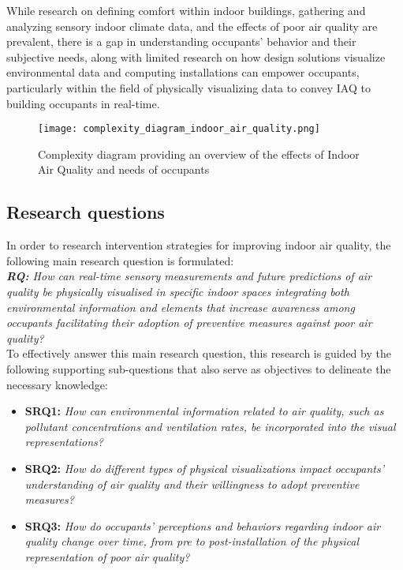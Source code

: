 While research on defining comfort within indoor buildings, gathering and analyzing sensory indoor climate data, and the effects of poor air quality are prevalent, there is a gap in understanding occupants' behavior and their subjective needs, along with limited research on how design solutions visualize environmental data and computing installations can empower occupants, particularly within the field of physically visualizing data to convey IAQ to building occupants in real-time.

\begin{figure}[h]
    \centering
    \texttt{[image: complexity\_diagram\_indoor\_air\_quality.png]}
    \caption{Complexity diagram providing an overview of the effects of Indoor Air Quality and needs of occupants}
    \label{fig:mesh1}
\end{figure}



\subsection{Research questions}

In order to research intervention strategies for improving indoor air quality, the following main research question is formulated: \\

\emph{\textbf{RQ:} How can real-time sensory measurements and future predictions of air quality be physically visualised in specific indoor spaces integrating both environmental information and elements that increase awareness among occupants facilitating their adoption of preventive measures against poor air quality?} \\

To effectively answer this main research question, this research is guided by the following supporting sub-questions that also serve as objectives to delineate the necessary knowledge: \\

\begin{itemize}
    \item \textbf{SRQ1:} \emph{How can environmental information related to air quality, such as pollutant concentrations and ventilation rates, be incorporated into the visual representations?}
    \item \textbf{SRQ2:} \emph{How do different types of physical visualizations impact occupants' understanding of air quality and their willingness to adopt preventive measures?}
    \item \textbf{SRQ3:} \emph{How do occupants' perceptions and behaviors regarding indoor air quality change over time, from pre to post-installation of the physical representation of poor air quality?}\\
\end{itemize}